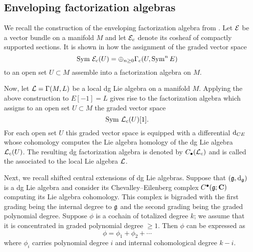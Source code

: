 \documentclass[11pt]{amsart}
\begin{document}
\subsection{Enveloping factorization algebras}
\label{s:enveloping}

We recall the construction of the enveloping factorization algebra from \cite{CG2}.
Let $\mathcal E$ be a vector bundle on a manifold $M$ and let $\mathcal E_c$ denote its cosheaf of compactly supported sections.
It is shown in \cite{CG1} how the assignment of the graded vector space
\begin{equation}
\operatorname{Sym} \, \mathcal E_c(U) = \oplus_{n \geq 0} \Gamma_c(U, \operatorname{Sym}^n E)
\end{equation}
to an open set $U \subset M$ assemble into a factorization algebra on $M$.

Now, let $\mathcal L = \Gamma(M,L)$ be a local dg Lie algebra on a manifold $M$.
Applying the above construction to $E[-1] = L$ gives rise \cite{CG2} to the factorization algebra which assigns to an open set $U \subset M$ the graded vector space 
\begin{equation}
\operatorname{Sym} \, \mathcal L_c (U) [1] .
\end{equation}
For each open set $U$ this graded vector space is equipped with a differential ${\rm d}_{CE}$ whose cohomology computes the Lie algebra homology of the dg Lie algebra $\mathcal L_c(U)$.
The resulting dg factorization algebra is denoted by $C_\bullet(\mathcal L_c)$ and is called the  associated to the local Lie algebra $\mathcal L$. 

Next, we recall shifted central extensions of dg Lie algebras.
Suppose that $(\mathfrak{g},{\rm d}_{\mathfrak{g}})$ is a dg Lie algebra and consider its Chevalley--Eilenberg complex $C^\bullet(\mathfrak{g};\mathbf{C})$ computing its Lie algebra cohomology.
This complex is bigraded with the first grading being the internal degree to $\mathfrak{g}$ and the second grading being the graded polynomial degree.
Suppose $\phi$ is a cochain of totalized degree $k$; we assume that it is concentrated in graded polynomial degree $\geq 1$.
Then $\phi$ can be expressed as
\begin{equation}
\phi = \phi_1 + \phi_2 + \cdots 
\end{equation}
where $\phi_i$ carries polynomial degree $i$ and internal cohomological degree $k-i$.
\end{document}
